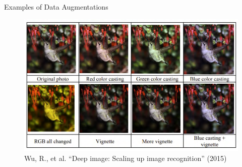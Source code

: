 \documentclass[serif, aspectratio=169]{beamer}
\begin{document}
\begin{frame}{Examples of Data Augmentations}
	\begin{figure}[htpb]
		\begin{center}
			\includegraphics[keepaspectratio, scale=0.29]{pic/augm}
			\caption*{\scriptsize{Wu, R., et al. ``Deep image: Scaling up image recognition'' (2015)}}
		\end{center}
	\end{figure}
\end{frame}
\end{document}
